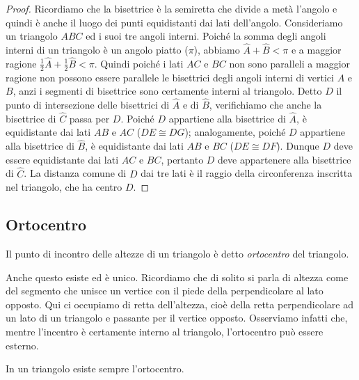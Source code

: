 \begin{figure}[htb]
	\centering
\end{figure}
\begin{proof}
Ricordiamo che la bisettrice è la semiretta che divide a metà l'angolo e quindi è anche il luogo dei punti equidistanti dai lati dell'angolo. Consideriamo un triangolo $ABC$ ed i suoi tre angoli interni. Poiché la somma degli angoli interni di un triangolo è un angolo piatto ($\pi$), abbiamo $\widehat{A}+\widehat{B}<\pi$ e a maggior ragione $\frac{1}{2}\widehat{A}+\frac{1}{2}\widehat{B}<\pi$. Quindi poiché i lati $AC$ e $BC$ non sono paralleli a maggior ragione non possono essere parallele le bisettrici degli angoli interni di vertici $A$ e $B$, anzi i segmenti di bisettrice sono certamente interni al triangolo. Detto $D$ il punto di intersezione delle bisettrici di $\widehat{A}$ e di $\widehat{B}$, verifichiamo che anche la bisettrice di $\widehat{C}$ passa per $D$. Poiché $D$ appartiene alla bisettrice di $\widehat{A}$, è equidistante dai lati $AB$ e $AC$ ($DE\cong DG$); analogamente, poiché $D$ appartiene alla bisettrice di $\widehat{B}$, è equidistante dai lati $AB$ e $BC$ ($DE\cong DF$). Dunque $D$ deve essere equidistante dai lati $AC$ e $BC$, pertanto $D$ deve appartenere alla bisettrice di $\widehat{C}$. La distanza comune di $D$ dai tre lati è il raggio della circonferenza inscritta nel triangolo, che ha centro $D$.
\end{proof}

\subsection{Ortocentro}

\begin{definizione}
Il punto di incontro delle altezze di un triangolo è detto \emph{ortocentro} del triangolo.
\end{definizione}

Anche questo esiste ed è unico. Ricordiamo che di solito si parla di altezza come del segmento che unisce un vertice con il piede della perpendicolare al lato opposto. Qui ci occupiamo di retta dell'altezza, cioè della retta perpendicolare ad un lato di un triangolo e passante per il vertice opposto. Osserviamo infatti che, mentre l'incentro è certamente interno al triangolo, l'ortocentro può essere esterno.

\begin{teorema}
In un triangolo esiste sempre l'ortocentro.
\end{teorema}

